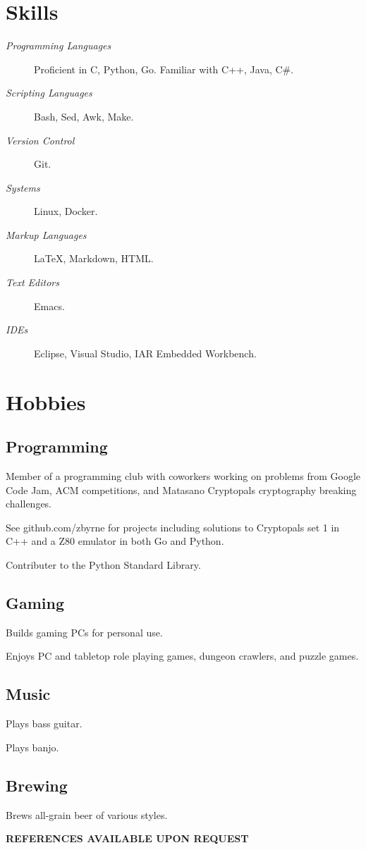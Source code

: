 \documentclass[10pt]{article}
\begin{document}
\newpage

\section*{Skills}
\begin{description}
  \item [\emph{Programming Languages}] Proficient in C, Python,
    Go. Familiar with C++, Java, C\#.
  \item [\emph{Scripting Languages}] Bash, Sed, Awk, Make.
  \item [\emph{Version Control}] Git.
  \item [\emph{Systems}] Linux, Docker.
  \item [\emph{Markup Languages}] \LaTeX, Markdown, HTML.
  \item [\emph{Text Editors}] Emacs.
  \item [\emph{IDEs}] Eclipse, Visual Studio, IAR Embedded Workbench.
\end{description}

\section*{Hobbies}
\subsection*{Programming}
  \begin{mitemize}
    \item Member of a programming club with coworkers working on
      problems from Google Code Jam, ACM competitions, and Matasano
      Cryptopals cryptography breaking challenges.
    \item See github.com/zbyrne for projects including solutions to
      Cryptopals set 1 in C++ and a Z80 emulator in both Go and
      Python.
    \item Contributer to the Python Standard Library.
  \end{mitemize}
\subsection*{Gaming}
  \begin{mitemize}
    \item Builds gaming PCs for personal use.
    \item Enjoys PC and tabletop role playing games, dungeon crawlers,
     and puzzle games.
  \end{mitemize}
\subsection*{Music}
  \begin{mitemize}
    \item Plays bass guitar.
    \item Plays banjo.
  \end{mitemize}
\subsection*{Brewing}
  \begin{mitemize}
    \item Brews all-grain beer of various styles.
  \end{mitemize}

\vspace{0.25in}
{\bf \centering REFERENCES AVAILABLE UPON REQUEST \par}
\end{document}
